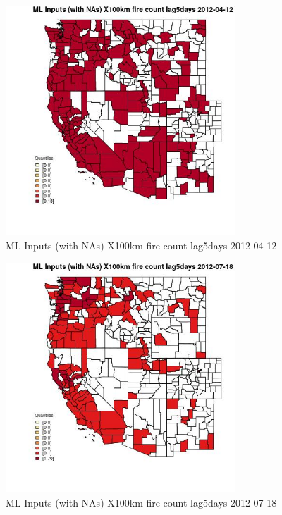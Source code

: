 \begin{figure} 
\centering  
\includegraphics[width=0.77\textwidth]{Code_Outputs/Report_ML_input_PM25_Step4_part_e_de_duplicated_aves_compiled_2019-05-14wNAs_CountyX100km_fire_count_lag5daysMean2012-04-12_2012-04-12.jpg} 
\caption{\label{fig:Report_ML_input_PM25_Step4_part_e_de_duplicated_aves_compiled_2019-05-14wNAsCountyX100km_fire_count_lag5daysMean2012-04-12_2012-04-12}ML Inputs (with NAs) X100km fire count lag5days 2012-04-12} 
\end{figure} 
 

\begin{figure} 
\centering  
\includegraphics[width=0.77\textwidth]{Code_Outputs/Report_ML_input_PM25_Step4_part_e_de_duplicated_aves_compiled_2019-05-14wNAs_CountyX100km_fire_count_lag5daysMean2012-07-18_2012-07-18.jpg} 
\caption{\label{fig:Report_ML_input_PM25_Step4_part_e_de_duplicated_aves_compiled_2019-05-14wNAsCountyX100km_fire_count_lag5daysMean2012-07-18_2012-07-18}ML Inputs (with NAs) X100km fire count lag5days 2012-07-18} 
\end{figure} 
 

